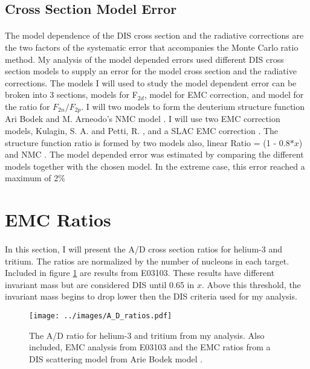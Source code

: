 \subsection{Cross Section Model Error}
\paragraph{}
The model dependence of the DIS cross section and the radiative corrections are the two factors of the systematic error that accompanies the Monte Carlo ratio method. My analysis of the model depended errors used different DIS cross section models to supply an error for the model cross section and the radiative corrections. The models I will used to study the model dependent error can be broken into 3 sections, models for F$_{2d}$, model for EMC correction, and model for the ratio for $F_{2n}/F_{2p}$. I will two models to form the deuterium structure function Ari Bodek \cite{DISmodel} and M. Arneodo's NMC model \cite{NMC_model}. I will use two EMC correction models, Kulagin, S. A. and Petti, R. \cite{kpmodel}, and a SLAC EMC correction \cite{SLAC_bodek}. The structure function ratio is formed by two models also, linear Ratio = (1 - 0.8$*x$) and NMC \cite{NMC_ratio}. The model depended error was estimated by comparing the different models together with the chosen model. In the extreme case, this error reached a maximum of 2\%    

\section{EMC Ratios}
\paragraph{}In this section, I will present the A/D cross section ratios for helium-3 and tritium. The ratios are normalized by the number of nucleons in each target. Included in figure \ref{ADplot} are results from E03103. These results have different invariant mass but are considered DIS until 0.65 in $x$. Above this threshold, the invariant mass begins to drop lower then the DIS criteria used for my analysis. 
\begin{figure}
	\centering
	\texttt{[image: ../images/A\_D\_ratios.pdf]}
	\caption{The A/D ratio for helium-3 and tritium from my analysis. Also included, EMC analysis from E03103\cite{seeley} and the EMC ratios from a DIS scattering model from Arie Bodek model \cite{DISmodel}.}
	\label{ADplot}
\end{figure}

